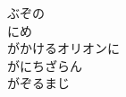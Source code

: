 \documentclass[10pt,b5j]{tarticle} %
\begin{document}
\begin{enumerate}
\begin{minipage}[c]{\blocksize}
        \vspace{\linespace}
        \item
        ぶぞの\\
        にめ\\
        がかけるオリオンに\\
        がにちざらん\\
        がぞるまじ
    
    \end{minipage}
\end{enumerate} %
\end{document}
